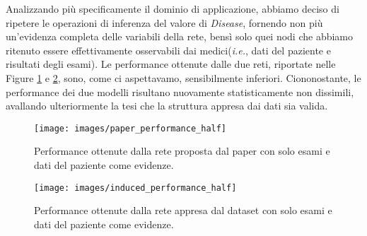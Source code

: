 Analizzando più specificamente il dominio di applicazione, abbiamo deciso di ripetere le operazioni di inferenza del valore di \textit{Disease}, fornendo non più un'evidenza completa delle variabili della rete, bensì solo quei nodi che abbiamo ritenuto essere effettivamente osservabili dai medici(\textit{i.e.}, dati del paziente e risultati degli esami).
Le performance ottenute dalle due reti, riportate nelle Figure \ref{fig:paperperformancehalf} e \ref{fig:inducedperformancehalf}, sono, come ci aspettavamo, sensibilmente inferiori. Ciononostante, le performance dei due modelli risultano nuovamente statisticamente non dissimili, avallando ulteriormente la tesi che la struttura appresa dai dati sia valida.
\begin{figure}
	\centering
	\texttt{[image: images/paper\_performance\_half]}
	\caption{Performance ottenute dalla rete proposta dal paper con solo esami e dati del paziente come evidenze.}
	\label{fig:paperperformancehalf}
\end{figure}
\begin{figure}
	\centering
	\texttt{[image: images/induced\_performance\_half]}
	\caption{Performance ottenute dalla rete appresa dal dataset con solo esami e dati del paziente come evidenze.}
	\label{fig:inducedperformancehalf}
\end{figure}

\newpage
